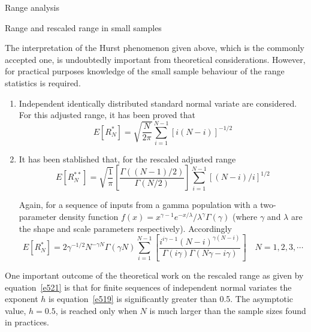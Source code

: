 \documentclass[8pt]{beamer}
\renewcommand{\emph}[1]{\textcolor{myorange}{#1}}
\begin{document}
  \begin{frame}{Range analysis}
    \vspace{-5pt}
      \begin{block}{Range and rescaled range in small samples}
    \end{block}
    \vspace{-5pt}
    The interpretation of the \emph{Hurst phenomenon} given above, which is the commonly accepted one, is undoubtedly important from theoretical considerations. However, for practical purposes knowledge of the small sample behaviour of the \emph{range statistics} is required. 
    \begin{enumerate}
        \item \emph{Independent identically  distributed standard normal variate} are considered. For this adjusted range, it has been proved that
    \vspace{-5pt}
\begin{equation}
    E[R_N^*] = \sqrt{\frac{N}{2\pi}} \sum_{i=1}^{N-1} \left[i(N-i)\right]^{-1/2}
    \label{e520}
    \end{equation}

\item It has been stablished that, for the \emph{rescaled adjusted range} 
    \vspace{-5pt}
\begin{equation}
    E[R_N^{**}] = \sqrt{\frac{1}{\pi}} \left[\frac{\Gamma((N-1)/2)}{\Gamma(N/2)} \right] \sum_{i=1}^{N-1} \left[(N-i)/i\right]^{1/2}
    \label{e521}
    \end{equation}

Again, for a sequence of inputs from a \emph{gamma population} with a two-parameter density function $f(x) = x^{\gamma-1} e^{-x/\lambda} / \lambda^{\gamma} \Gamma(\gamma)$ (where $\gamma$ and $\lambda$ are the shape and scale parameters respectively). Accordingly
\begin{equation}
    E[R_N^{*}] = 2\gamma^{-1/2} N^{-\gamma N} \Gamma(\gamma N) \sum_{i=1}^{N-1} \left[ \frac{i^{i\gamma - 1} (N-i)^{\gamma(N-i)}}{\Gamma(i\gamma) \Gamma(N\gamma - i\gamma)}\right] \quad  N=1,2,3, \cdots
    \label{e522}
    \end{equation}
\end{enumerate}
One important outcome of the theoretical work on the rescaled range as given by equation~\ref{e521} is that for finite sequences of \emph{independent  normal variates} the exponent $h$ is equation~\ref{e519} is significantly greater than 0.5. The asymptotic value, $h=0.5$, is reached only when $N$ is much larger than the sample sizes found in practices. 
\end{frame}
 
\end{document}

